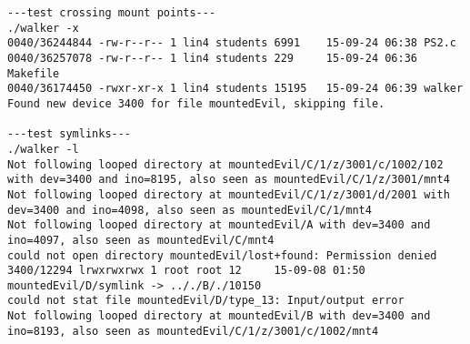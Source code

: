 \documentclass[12pt]{article}
\begin{document}
\begin{lstlisting}
---test crossing mount points---
./walker -x
0040/36244844 -rw-r--r-- 1 lin4 students 6991	 15-09-24 06:38 PS2.c
0040/36257078 -rw-r--r-- 1 lin4 students 229	 15-09-24 06:36 Makefile
0040/36174450 -rwxr-xr-x 1 lin4 students 15195	 15-09-24 06:39 walker
Found new device 3400 for file mountedEvil, skipping file.

---test symlinks---
./walker -l
Not following looped directory at mountedEvil/C/1/z/3001/c/1002/102 with dev=3400 and ino=8195, also seen as mountedEvil/C/1/z/3001/mnt4
Not following looped directory at mountedEvil/C/1/z/3001/d/2001 with dev=3400 and ino=4098, also seen as mountedEvil/C/1/mnt4
Not following looped directory at mountedEvil/A with dev=3400 and ino=4097, also seen as mountedEvil/C/mnt4
could not open directory mountedEvil/lost+found: Permission denied
3400/12294 lrwxrwxrwx 1 root root 12	 15-09-08 01:50 mountedEvil/D/symlink -> .././B/./10150
could not stat file mountedEvil/D/type_13: Input/output error
Not following looped directory at mountedEvil/B with dev=3400 and ino=8193, also seen as mountedEvil/C/1/z/3001/c/1002/mnt4


\end{lstlisting}
\end{document}
